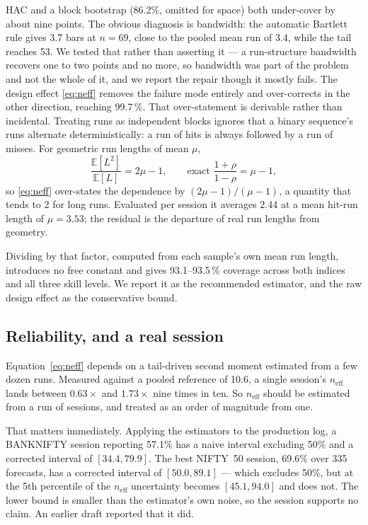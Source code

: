 \documentclass[conference]{IEEEtran}
\begin{document}
HAC and a block bootstrap (86.2\%, omitted for space) both under-cover by about
nine points. The obvious diagnosis is bandwidth: the automatic Bartlett rule
gives 3.7 bars at $n=69$, close to the pooled mean run of 3.4, while the tail
reaches 53. We tested that rather than asserting it --- a run-structure
bandwidth recovers one to two points and no more, so bandwidth was part of the
problem and not the whole of it, and we report the repair though it mostly
fails. The design effect \eqref{eq:neff} removes the failure mode entirely and
over-corrects in the other direction, reaching 99.7\,\%. That over-statement is
derivable rather than incidental. Treating runs as independent blocks ignores
that a binary sequence's runs alternate deterministically: a run of hits is
always followed by a run of misses. For geometric run lengths of mean $\mu$,
\begin{equation}
\frac{\mathbb{E}[L^2]}{\mathbb{E}[L]} = 2\mu - 1,
\qquad
\text{exact } \frac{1+\rho}{1-\rho} = \mu - 1,
\label{eq:alt}
\end{equation}
so \eqref{eq:neff} over-states the dependence by $(2\mu-1)/(\mu-1)$, a quantity
that tends to 2 for long runs. Evaluated per session it averages 2.44 at a mean
hit-run length of $\mu = 3.53$; the residual is the departure of real run
lengths from geometry.

Dividing by that factor, computed from each sample's own mean run length,
introduces no free constant and gives 93.1--93.5\,\% coverage across both
indices and all three skill levels. We report it as the recommended estimator,
and the raw design effect as the conservative bound.

\subsection{Reliability, and a real session}

Equation~\eqref{eq:neff} depends on a tail-driven second moment estimated from a
few dozen runs. Measured against a pooled reference of 10.6, a single session's
$n_{\text{eff}}$ lands between $0.63\times$ and $1.73\times$ nine times in ten.
So $n_{\text{eff}}$ should be estimated from a run of sessions, and treated as
an order of magnitude from one.

That matters immediately. Applying the estimators to the production log, a
BANKNIFTY session reporting 57.1\% has a naive interval excluding 50\% and a
corrected interval of $[34.4, 79.9]$. The best NIFTY~50 session, 69.6\% over 335
forecasts, has a corrected interval of $[50.0, 89.1]$ --- which excludes 50\%,
but at the 5th percentile of the $n_{\text{eff}}$ uncertainty becomes
$[45.1, 94.0]$ and does not. The lower bound is smaller than the estimator's own
noise, so the session supports no claim. An earlier draft reported that it did.
\end{document}

